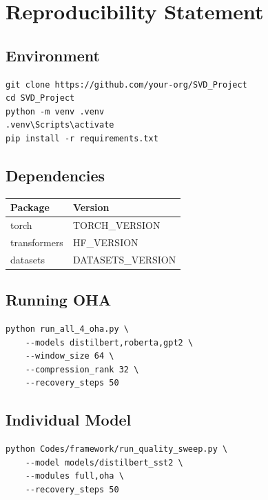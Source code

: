
\section{Reproducibility Statement}

\subsection{Environment}

\begin{lstlisting}
git clone https://github.com/your-org/SVD_Project
cd SVD_Project
python -m venv .venv
.venv\Scripts\activate
pip install -r requirements.txt
\end{lstlisting}

\subsection{Dependencies}

\begin{table}[H]
\centering
\small
\begin{tabular}{ll}
\toprule
\textbf{Package} & \textbf{Version} \\
\midrule
torch & {{TORCH\_VERSION}} \\
transformers & {{HF\_VERSION}} \\
datasets & {{DATASETS\_VERSION}} \\
\bottomrule
\end{tabular}
\end{table}

\subsection{Running OHA}

\begin{lstlisting}
python run_all_4_oha.py \
    --models distilbert,roberta,gpt2 \
    --window_size 64 \
    --compression_rank 32 \
    --recovery_steps 50
\end{lstlisting}

\subsection{Individual Model}

\begin{lstlisting}
python Codes/framework/run_quality_sweep.py \
    --model models/distilbert_sst2 \
    --modules full,oha \
    --recovery_steps 50
\end{lstlisting}


